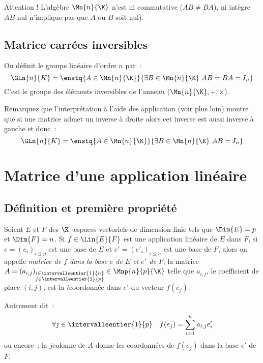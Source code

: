 Attention ! L'algèbre $\Mn{n}{\K}$ n'est ni commutative ($AB \neq BA$), ni intègre $AB$ nul n'implique pas que $A$ ou $B$ soit nul).

\subsection{Matrice carrées inversibles}

On définit le groupe linéaire d'ordre $n$ par~:
\begin{equation}
	\GLn{n}{K} = \enstq{A \in \Mn{n}{\K}}{\exists B \in \Mn{n}{\K} \ AB=BA=I_n}
\end{equation}
C'est le groupe des éléments inversibles de l'anneau $(\Mn{n}{\K}, +, \times)$.

Remarquez que l'interprétation à l'aide des application (voir plus loin) montre que si une matrice admet un inverse à droite alors cet inverse est aussi inverse à gauche et donc~:
\begin{equation}
	\GLn{n}{K} = \enstq{A \in \Mn{n}{\K}}{\exists B \in \Mn{n}{\K} \ AB=I_n}
\end{equation}

\section{Matrice d'une application linéaire}
\subsection{Définition et première propriété}

Soient $E$ et $F$ des $\K$ -espaces vectoriels de dimension finie tels que $\Dim{E}=p$ et $\Dim{F}=n$. Si $f\in \Lin{E}{F}$ est une application linéaire de $E$ dans $F$, si $e=(e_i)_{i\leqslant p}$ est une base de $E$ et $e'=(e'_i)_{i\leqslant n}$ est une base de $F$, alors on appelle \emph{matrice de $f$ dans la base $e$ de $E$ et $e'$ de $F$}, la matrice $A=(a_{i,j})_{\substack{i \in \intervalleentier{1}{n} \\ j \in \intervalleentier{1}{p}}} \in \Mnp{n}{p}{\K}$ telle que $a_{i,j}$, le coefficient de place $(i,j)$, est la $i$\ieme coordonnée dans $e'$ du vecteur $f(e_j)$.
	
Autrement dit~:
\begin{equation}
	\forall j \in \intervalleentier{1}{p} \quad f(e_j) = \sum_{i=1}^n a_{i,j} e'_i
\end{equation}
ou encore~: la $j$\ieme colonne de $A$ donne les coordonnées de $f(e_j)$ dans la base $e'$ de $F$.

